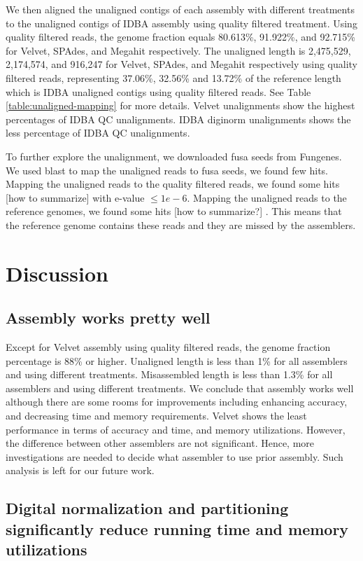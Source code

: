 We then aligned the unaligned contigs of each assembly with different treatments to the unaligned contigs of IDBA assembly using quality filtered treatment. 
Using quality filtered reads, the genome fraction equals 80.613\%, 91.922\%, and 92.715\% for Velvet, SPAdes, and Megahit respectively.  The unaligned length is 2,475,529, 2,174,574, and  916,247  for Velvet, SPAdes, and Megahit respectively using quality filtered reads, representing 37.06\%, 32.56\% and 13.72\% of the reference length which is IDBA unaligned contigs using quality filtered reads. See Table \ref{table:unaligned-mapping} for more details.  Velvet unalignments show the highest percentages of IDBA QC unalignments. IDBA diginorm unalignments shows the less percentage of IDBA QC unalignments. 

To further explore the unalignment, we downloaded fusa seeds from Fungenes. We used blast to map the unaligned reads to fusa seeds, we found few hits. Mapping the unaligned reads to the quality filtered reads, we found some hits  [how to summarize] with e-value $\leq 1e-6$. Mapping the unaligned reads to the reference genomes, we found  some hits [how to summarize?] . This means that the reference genome contains these reads and they are missed by the assemblers. 

\section*{Discussion}
 
 \subsection*{Assembly works pretty well} 
 Except for Velvet assembly using quality filtered reads, the genome fraction percentage is  88\% or higher.  Unaligned length is less than 1\% for all assemblers and using different treatments. 
 Misassembled length is less than 1.3\% for all assemblers and using different treatments. We conclude that assembly works well although there are some rooms for improvements including enhancing accuracy, and decreasing time and memory requirements. Velvet shows the least performance in terms of accuracy and time, and memory utilizations. However, the difference between other assemblers are not significant. Hence, more investigations are needed to decide what assembler to use prior assembly. Such analysis is left for our future work. 
 
 \subsection*{Digital normalization and partitioning significantly reduce running time and memory utilizations}
 
